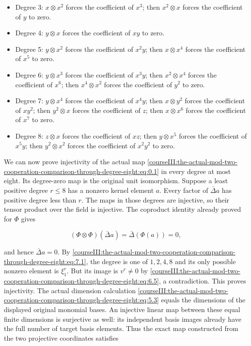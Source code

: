 \begin{itemize}

\item
  Degree 3: \(x\otimes x^{2}\) forces the coefficient of \(x^{3}\); then \(x^{2}\otimes x\) forces the coefficient of \(y\) to zero.
\item
  Degree 4: \(y\otimes x\) forces the coefficient of \(xy\) to zero.
\item
  Degree 5: \(y\otimes x^{2}\) forces the coefficient of \(x^{2}y\); then \(x\otimes x^{4}\) forces the coefficient of \(x^{5}\) to zero.
\item
  Degree 6: \(y\otimes x^{3}\) forces the coefficient of \(x^{3}y\); then \(x^{2}\otimes x^{4}\) forces the coefficient of \(x^{6}\); then \(x^{4}\otimes x^{2}\) forces the coefficient of \(y^{2}\) to zero.
\item
  Degree 7: \(y\otimes x^{4}\) forces the coefficient of \(x^{4}y\); then \(x\otimes y^{2}\) forces the coefficient of \(xy^{2}\); then \(y^{2}\otimes x\) forces the coefficient of \(z\); then \(x\otimes x^{6}\) forces the coefficient of \(x^{7}\) to zero.
\item
  Degree 8: \(z\otimes x\) forces the coefficient of \(xz\); then \(y\otimes x^{5}\) forces the coefficient of \(x^{5}y\); then \(y^{2}\otimes x^{2}\) forces the coefficient of \(x^{2}y^{2}\) to zero.
\end{itemize}

We can now prove injectivity of the actual map \eqref{courseIII:the-actual-mod-two-cooperation-comparison-through-degree-eight:eq:0.1} in every degree at most eight. Its degree-zero map is the original unit isomorphism. Suppose a least positive degree \(r\leq8\) has a nonzero kernel element \(a\). Every factor of \(\bar\Delta a\) has positive degree less than \(r\). The maps in those degrees are injective, so their tensor product over the field is injective. The coproduct identity already proved for \(\Phi\) gives

\begin{equation}
(\Phi\otimes\Phi)(\bar\Delta a)
 =\bar\Delta(\Phi(a))=0,
\label{courseIII:the-actual-mod-two-cooperation-comparison-through-degree-eight:eq:7.2}
\end{equation}

and hence \(\bar\Delta a=0\). By \eqref{courseIII:the-actual-mod-two-cooperation-comparison-through-degree-eight:eq:7.1}, the degree is one of \(1,2,4,8\) and its only possible nonzero element is \(\xi_1^r\). But its image is \(v^r\neq0\) by \eqref{courseIII:the-actual-mod-two-cooperation-comparison-through-degree-eight:eq:6.5}, a contradiction. This proves injectivity. The actual dimension calculation \eqref{courseIII:the-actual-mod-two-cooperation-comparison-through-degree-eight:eq:5.3} equals the dimensions of the displayed original monomial bases. An injective linear map between these equal finite dimensions is surjective as well: its independent basis images already have the full number of target basis elements. Thus the exact map constructed from the two projective coordinates satisfies

